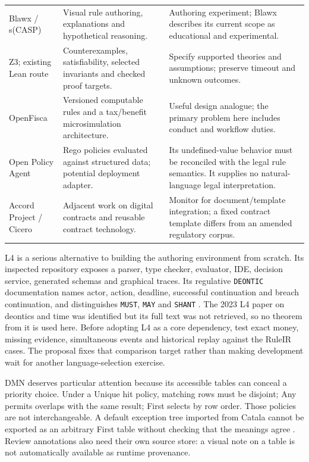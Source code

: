 \documentclass[12pt,a4paper,oneside,openany]{book}
\begin{document}
\begin{longtable}{P{0.19\textwidth}P{0.37\textwidth}P{0.34\textwidth}}
Blawx / s(CASP) & Visual rule authoring, explanations and hypothetical reasoning. & Authoring experiment; Blawx describes its current scope as educational and experimental. \citep{blawxcode,slaw2024}\\
Z3; existing Lean route & Counterexamples, satisfiability, selected invariants and checked proof targets. & Specify supported theories and assumptions; preserve timeout and unknown outcomes. \citep{z3code,localrepos}\\
OpenFisca & Versioned computable rules and a tax/benefit microsimulation architecture. & Useful design analogue; the primary problem here includes conduct and workflow duties. \citep{openfiscacode}\\
Open Policy Agent & Rego policies evaluated against structured data; potential deployment adapter. & Its undefined-value behavior must be reconciled with the legal rule semantics. It supplies no natural-language legal interpretation. \citep{opadocs}\\
Accord Project / Cicero & Adjacent work on digital contracts and reusable contract technology. & Monitor for document/template integration; a fixed contract template differs from an amended regulatory corpus. \citep{cicerocode}\\
\bottomrule
\end{longtable}
\endgroup

L4 is a serious alternative to building the authoring environment from scratch.
Its inspected repository exposes a parser, type checker, evaluator, IDE,
decision service, generated schemas and graphical traces. Its regulative
\texttt{DEONTIC} documentation names actor, action, deadline, successful
continuation and breach continuation, and distinguishes \texttt{MUST},
\texttt{MAY} and \texttt{SHANT} \citep{l4code}. The 2023 L4 paper on deontics
and time was identified but its full text was not retrieved, so no theorem from
it is used here. Before adopting L4 as a core dependency, test exact money,
missing evidence, simultaneous events and historical replay against the RuleIR
cases. The proposal fixes that comparison target rather than making development
wait for another language-selection exercise.

DMN deserves particular attention because its accessible tables can conceal a
priority choice. Under a Unique hit policy, matching rows must be disjoint; Any
permits overlaps with the same result; First selects by row order. Those policies
are not interchangeable. A default exception tree imported from Catala cannot be
exported as an arbitrary First table without checking that the meanings agree
\citep[sec.~8.2.11]{dmn2024}. Review annotations also need their own source store:
a visual note on a table is not automatically available as runtime provenance.
\end{document}
